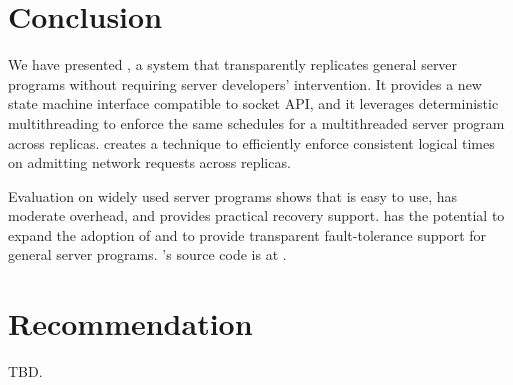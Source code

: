 \section{Conclusion} \label{sec:conclusion}
We have presented \xxx, a \smr system that 
transparently replicates general server programs without 
requiring server developers' intervention. It provides a new state machine 
interface compatible to socket API, and it leverages 
deterministic multithreading to enforce the same schedules for a multithreaded 
server program across replicas. \xxx creates a \timealgo technique to 
efficiently enforce consistent logical times on admitting network requests 
across replicas.

Evaluation on \nprog widely used server programs shows that 
\xxx is easy to use, has moderate overhead, and provides practical recovery 
support. \xxx has the potential to expand the adoption of \smr and to provide 
transparent fault-tolerance support for general server programs. \xxx's 
source code is at \github.

\section{Recommendation} \label{sec:recommendation}
TBD.
% 
